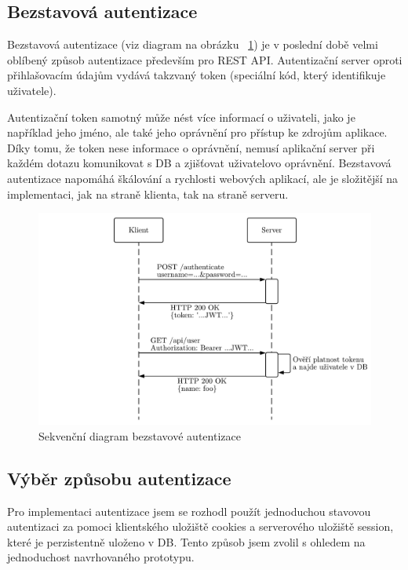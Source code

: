 \subsection{Bezstavová autentizace}\label{subsec:bezstavováAutentizace}
Bezstavová autentizace (viz diagram na obrázku ~\ref{fig:statelessAuthentication}) je v poslední době velmi oblíbený způsob autentizace především pro \gls{REST} \gls{API}.
Autentizační server oproti přihlašovacím údajům vydává takzvaný token (speciální kód, který identifikuje uživatele).

Autentizační token samotný může nést více informací o uživateli, jako je například jeho jméno, ale také jeho oprávnění pro přístup ke zdrojům aplikace.
Díky tomu, že token nese informace o oprávnění, nemusí aplikační server při každém dotazu komunikovat s DB a zjišťovat uživatelovo oprávnění.
Bezstavová autentizace napomáhá škálování a rychlosti webových aplikací, ale je složitější na implementaci, jak na straně klienta, tak na straně serveru.

\begin{figure}[ht!]
    \centering
    \includegraphics[width=.9\textwidth]{partials/navrh/statelessAuthentication.pdf}
    \caption{Sekvenční diagram bezstavové autentizace}\label{fig:statelessAuthentication}
\end{figure}

\subsection{Výběr způsobu autentizace}\label{subsec:výběrZpůsobuAutentizace}
Pro implementaci autentizace jsem se rozhodl použít jednoduchou stavovou autentizaci za pomoci klientského uložiště cookies a serverového uložiště session, které je perzistentně uloženo v DB.
Tento způsob jsem zvolil s ohledem na jednoduchost navrhovaného prototypu.


